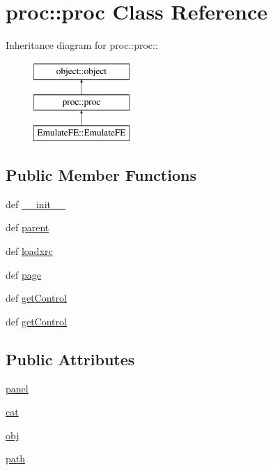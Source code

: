 \hypertarget{classproc_1_1proc}{
\section{proc::proc Class Reference}
\label{classproc_1_1proc}
}
Inheritance diagram for proc::proc::\begin{figure}[H]
\begin{center}
\leavevmode
\includegraphics[height=3cm]{classproc_1_1proc}
\end{center}
\end{figure}
\subsection*{Public Member Functions}
\begin{DoxyCompactItemize}
\item 
def \hyperlink{classproc_1_1proc_a21e9bcad44f0098f74639f245d2d0e4b}{\_\-\_\-init\_\-\_\-}
\item 
def \hyperlink{classproc_1_1proc_a73ad55427f28a79ef0483e18ce996e14}{parent}
\item 
def \hyperlink{classproc_1_1proc_a2192e09617c5de1798ca71123cb390bb}{loadxrc}
\item 
def \hyperlink{classproc_1_1proc_ac70ada08e4fc982a3e61e9ee77b247bf}{page}
\item 
def \hyperlink{classobject_1_1object_ac765747a2b581d48eeb94e600c31fc3f}{getControl}
\item 
def \hyperlink{classobject_1_1object_ac765747a2b581d48eeb94e600c31fc3f}{getControl}
\end{DoxyCompactItemize}
\subsection*{Public Attributes}
\begin{DoxyCompactItemize}
\item 
\hyperlink{classproc_1_1proc_a9ee372f307278c50a935b46ca00a350a}{panel}
\item 
\hyperlink{classobject_1_1object_a4fbaf843d1f40843b2c3895cb73ffada}{cat}
\item 
\hyperlink{classobject_1_1object_a15f13858ecdbf661a97a7da93d717922}{obj}
\item 
\hyperlink{classobject_1_1object_a6b4e1fd053496eafff2bc0f8aed7f089}{path}
\end{DoxyCompactItemize}


